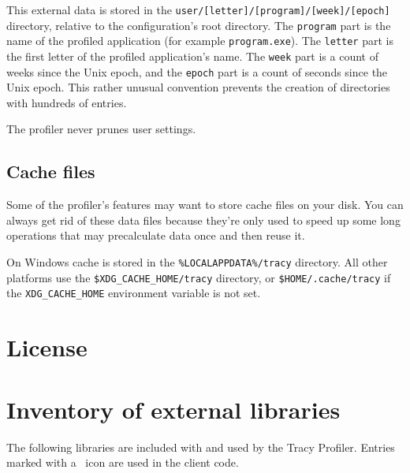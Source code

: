 \documentclass[hidelinks,titlepage,a4paper,twoside]{article}
\begin{document}
This external data is stored in the \texttt{user/[letter]/[program]/[week]/[epoch]} directory, relative to the configuration's root directory. The \texttt{program} part is the name of the profiled application (for example \texttt{program.exe}). The \texttt{letter} part is the first letter of the profiled application's name. The \texttt{week} part is a count of weeks since the Unix epoch, and the \texttt{epoch} part is a count of seconds since the Unix epoch. This rather unusual convention prevents the creation of directories with hundreds of entries.

The profiler never prunes user settings.

\subsection{Cache files}

Some of the profiler's features may want to store cache files on your disk. You can always get rid of these data files because they're only used to speed up some long operations that may precalculate data once and then reuse it.

On Windows cache is stored in the \texttt{\%LOCALAPPDATA\%/tracy} directory. All other platforms use the \texttt{\$XDG\_CACHE\_HOME/tracy} directory, or \texttt{\$HOME/.cache/tracy} if the \texttt{XDG\_CACHE\_HOME} environment variable is not set.

\newpage
\appendix
\appendixpage

\section{License}



\section{Inventory of external libraries}

The following libraries are included with and used by the Tracy Profiler. Entries marked with a \faStar{}~icon are used in the client code.
\end{document}
